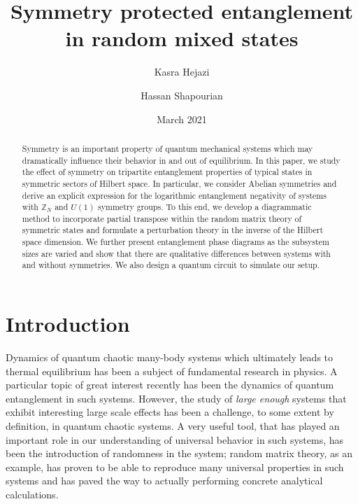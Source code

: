 \documentclass[aps,pra,reprint,superscriptaddress,twocolumn,notitlepage]{revtex4-1}
\numberwithin{equation}{section}
\begin{document}
\title{Symmetry protected entanglement in random mixed states}

\author{Kasra Hejazi}

\author{Hassan Shapourian}

\date{March 2021}

\begin{abstract}
Symmetry is an important property of quantum mechanical systems which may dramatically influence their behavior in and out of equilibrium. In this paper, we study the effect of symmetry on tripartite entanglement properties of typical states in symmetric sectors of Hilbert space. 
In particular, we consider Abelian symmetries and derive an explicit expression for the logarithmic entanglement negativity of systems with $\mathbb{Z}_N$ and $U(1)$ symmetry groups.
To this end, we develop a diagrammatic method to incorporate partial transpose within the random matrix theory of symmetric states and formulate a perturbation theory in the inverse of the Hilbert space dimension. We further present entanglement phase diagrams as the subsystem sizes are varied and show that there are qualitative differences between systems with and without symmetries. We also design a quantum circuit to simulate our setup.
\end{abstract}

\maketitle



\section{Introduction}


Dynamics of quantum chaotic many-body systems which ultimately leads to thermal equilibrium has been a subject of fundamental research in physics. A particular topic of great interest recently has been the dynamics of quantum entanglement in such systems. However, the study of {\it large enough} systems that exhibit interesting large scale effects has been a challenge, to some extent by definition, in quantum chaotic systems. A very useful tool, that has played an important role in our understanding of universal behavior in such systems, has been the introduction of randomness in the system; random matrix theory, as an example, has proven to be able to reproduce many universal properties in such systems \cite{BGS1984,GUHR1998,Berry_spectral_rigidity,2018PhRvX...8b1062K} and has paved the way to actually performing concrete analytical calculations.
\end{document}
